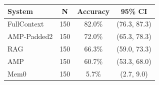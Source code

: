 \begin{tabular}{lccc}
\toprule
System & N & Accuracy & 95\% CI \\
\midrule
FullContext & 150 & 82.0\% & (76.3, 87.3) \\
AMP-Padded2 & 150 & 72.0\% & (65.3, 78.3) \\
RAG & 150 & 66.3\% & (59.0, 73.3) \\
AMP & 150 & 60.7\% & (53.3, 68.0) \\
Mem0 & 150 & 5.7\% & (2.7, 9.0) \\
\bottomrule
\end{tabular}